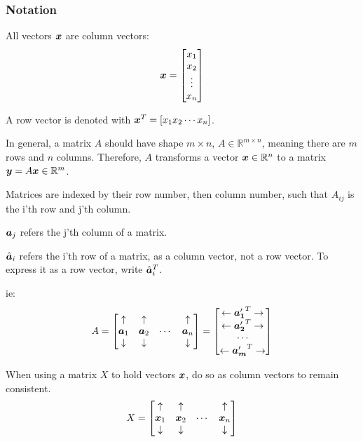 \documentclass[../../main.tex]{subfiles}
\begin{document}
\subsubsection{Notation}

All vectors $\bm{x}$ are column vectors:
\[
\bm{x} = \left[\begin{matrix}
        x_1\\
        x_2\\
        \vdots\\
        x_n
\end{matrix}\right]
\]

A row vector is denoted with $\bm{x}^T = \left[ x_1 x_2 \cdots  x_n\right]$.

In general, a matrix $A$ should have shape $m\times n$, $A \in \mathbb{R}^{m\times n}$, meaning there are $m$ rows and $n$ columns. Therefore, $A$ transforms a vector $\bm{x} \in \mathbb{R}^n$ to a matrix $\bm{y} = A\bm{x} \in \mathbb{R}^m$.

Matrices are indexed by their row number, then column number, such that $A_{ij}$ is the i'th row and j'th column.

$\bm{a}_j$ refers the j'th column of a matrix.

$\hat{\bm{a}}_i$ refers the i'th row of a matrix, as a column vector, not a row vector. To express it as a row vector, write $\hat{\bm{a}}_i^T$.

ie:
\[ A =
\left[\begin{matrix}
        \uparrow & \uparrow & & \uparrow \\
        \bm{a}_1 & \bm{a}_2 & \cdots & \bm{a}_n \\
        \downarrow & \downarrow & & \downarrow
\end{matrix}\right] =
\left[\begin{matrix}
    \leftarrow { \bm{a_1} '}^T \rightarrow \\
    \leftarrow { \bm{a_2} '}^T \rightarrow \\
    \cdots \\
    \leftarrow { \bm{a_m} '}^T \rightarrow \\
\end{matrix}\right]
\]


When using a matrix $X$ to hold vectors $\bm{x}$, do so as column vectors to remain consistent.
\[
X = \left[\begin{matrix}
        \uparrow & \uparrow & & \uparrow \\
        \bm{x}_1 & \bm{x}_2 & \cdots & \bm{x}_n \\
        \downarrow & \downarrow & & \downarrow
\end{matrix}\right]
\]
\end{document}
